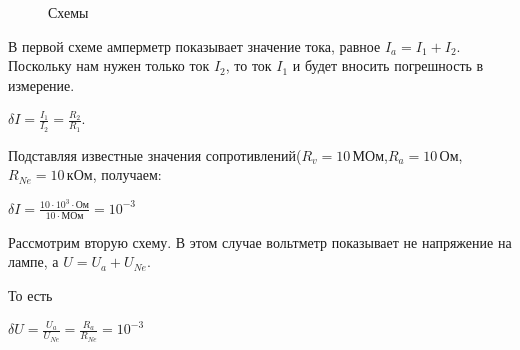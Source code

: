 \begin{figure}[H]
\begin{minipage}[H]{0.49\linewidth}
\end{minipage}
\hfill
\begin{minipage}[H]{0.49\linewidth}
\end{minipage}
\caption{Схемы}
\end{figure}


В первой схеме амперметр показывает значение тока, равное $I_a=I_1+I_2$. Поскольку нам нужен только ток $I_2$, то ток $I_1$ и будет вносить погрешность в измерение. 
\begin{center}
$\delta I= \frac{I_1}{I_2}=\frac{R_2}{R_1}$. 
\end{center}
Подставляя известные значения сопротивлений($R_v=10\, \text{МОм}$,$R_a=10\, \text{Ом}$,$R_{Ne}=10 \,\text{кОм}$, получаем:
\begin{center}
$\delta I=\frac{10\cdot10^3\cdot\text{Ом}}{10\cdot \text{МОм}}=10^{-3}$
\end{center}
Рассмотрим вторую схему. В этом случае вольтметр  показывает не напряжение на лампе, а $U=U_a+U_{Ne}$.

То есть 

\begin{center}
$ \delta U =\frac{U_a}{U_{Ne}}=\frac{R_a}{R_{Ne}} = 10^{-3} $
\end{center}



